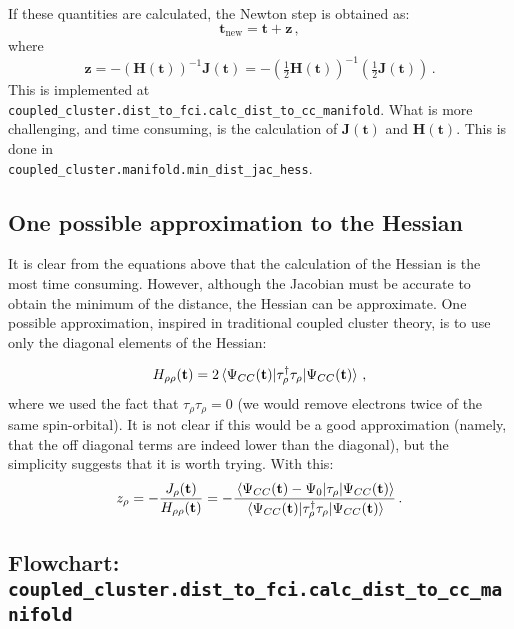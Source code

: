 If these quantities are calculated, the Newton step is obtained as:
\begin{equation}\label{eq:cc_minD_update}
  \mathbf{t}_\text{new} = \mathbf{t} + \mathbf{z}\,,
\end{equation}
where
\begin{equation}\label{eq:cc_minD_z}
  \mathbf{z}
  = - \left(\mathbf{H}(\mathbf{t})\right)^{-1}\mathbf{J}(\mathbf{t})
  = - \left(\tfrac{1}{2}\mathbf{H}(\mathbf{t})\right)^{-1}
  \left(\tfrac{1}{2}\mathbf{J}(\mathbf{t})\right)\,.
\end{equation}
This is implemented at \texttt{coupled\_cluster.dist\_to\_fci.calc\_dist\_to\_cc\_manifold}.
What is more challenging, and time consuming, is the calculation of $\mathbf{J}(\mathbf{t})$ and
$\mathbf{H}(\mathbf{t})$.
This is done in\\ \texttt{coupled\_cluster.manifold.min\_dist\_jac\_hess}.

\subsection{One possible approximation to the Hessian}
\label{sec:cc_man_appr_hess}

It is clear from the equations above that the calculation of the Hessian is the most time consuming.
However, although the Jacobian must be accurate to obtain the minimum of the distance,
the Hessian can be approximate.
One possible approximation, inspired in traditional coupled cluster theory,
is to use only the diagonal elements of the Hessian:

\begin{equation}\label{eq:cc_minD_hess_diag}
  \begin{split}
    H_{\rho\rho}(\mathbf{t}) =
    2\mel{\Psi_{CC}(\mathbf{t})}{\tau_\rho^\dagger\tau_\rho}{\Psi_{CC}(\mathbf{t})}\,,
  \end{split}
\end{equation}
where we used the fact that $\tau_\rho\tau_\rho = 0$
(we would remove electrons twice of the same spin-orbital).
It is not clear if this would be a good approximation
(namely, that the off diagonal terms are indeed lower than the diagonal),
but the simplicity suggests that it is worth trying.
With this:
\begin{equation}\label{eq:cc_minD_z_diag}
  z_\rho
  = - \frac{J_\rho(\mathbf{t})}{H_{\rho\rho}(\mathbf{t})}
  = - \frac{\mel{\Psi_{CC}(\mathbf{t}) - \Psi_0}{\tau_\rho}{\Psi_{CC}(\mathbf{t})}}
  {\mel{\Psi_{CC}(\mathbf{t})}{\tau_\rho^\dagger\tau_\rho}{\Psi_{CC}(\mathbf{t})}}\,.
\end{equation}

\newpage
\subsection{Flowchart: \texttt{coupled\_cluster.dist\_to\_fci.calc\_dist\_to\_cc\_manifold}}



